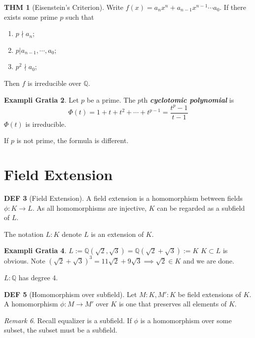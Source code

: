 \documentclass[twocolumn]{article}
\renewcommand{\emph}[1]{\textbf{\textit{#1}}}
\newcommand{\Q}{\mathbb{Q}}
\theoremstyle{definition}
\newtheorem{thm}{THM}
\newtheorem{example}[thm]{Exampli Gratia}
\newtheorem{defi}[thm]{DEF}
\theoremstyle{remark}
\newtheorem{remark}[thm]{Remark}
\begin{document}
\begin{thm}[Eisenstein's Criterion]
	Write $f(x) = a_n x^n + a_{n-1}x^{n-1} \cdots a_0$.
	If there exists some prime $p$ such that 
	\begin{enumerate}
		\item $p \nmid a_n$;
		\item $p | a_{n-1}, \cdots, a_0$;
		\item $p^2 \nmid  a_0$;
	\end{enumerate}
	Then $f$ is irreducible over $\Q$.
\end{thm}

\begin{example}
	Let $p$ be a prime. 
	The $p$th \emph{cyclotomic polynomial} is 
	$$
		\Phi(t) = 1 + t + t^2 + \cdots + t^{p-1} = \frac{t^p - 1}{t - 1}
	$$
	$\Phi(t)$ is irreducible.

	If $p$ is not prime, the formula is different.
\end{example}

\section{Field Extension}

\begin{defi}[Field Extension]
	A field extension is a homomorphism between fields $\phi: K \rightarrow L$. 
	As all homomorphisms are injective, $K$ can be regarded as a subfield of $L$.

	The notation $L:K$ denote $L$ is an extension of $K$.
\end{defi}

\begin{example}
	$L := \Q(\sqrt{2}, \sqrt{3}) = \Q(\sqrt{2} + \sqrt{3}) := K$
	$K \subset L$ is obvious.
	Note $(\sqrt{2} + \sqrt{3})^3 = 11 \sqrt{2} + 9 \sqrt{3} \implies \sqrt{2} \in K$ and we are done.

	$L : \Q$ has degree 4.
\end{example}

\begin{defi}[Homomorphism over subfield]
	Let $M : K, M' : K$ be field extensions of $K$. A homomorphism $\phi: M \rightarrow M'$ over $K$ is one that preserves all elements of $K$.
\end{defi}

\begin{remark}
	Recall equalizer is a subfield. If $\phi$ is a homomorphism over some subset, the subset must be a subfield.
\end{remark}
\end{document}
